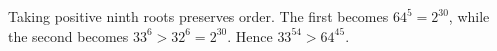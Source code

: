 Taking positive ninth roots preserves order. The first becomes $ 64^5=2^{30}$, while the second becomes $ 33^6>32^6=2^{30}$. Hence $\boxed{33^{54}>64^{45}}$.

